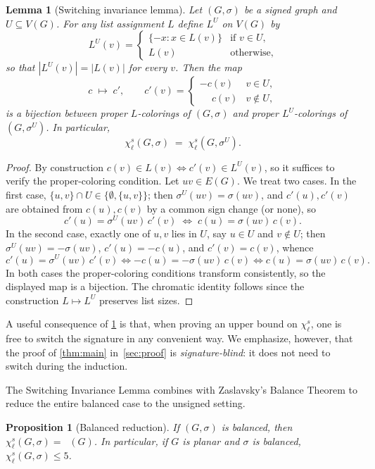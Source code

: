 \documentclass[11pt,a4paper]{article}
\theoremstyle{plain}
\newtheorem{lemma}[theorem]{Lemma}
\newtheorem{proposition}[theorem]{Proposition}
\theoremstyle{definition}
\newcommand{\E}{E}
\newcommand{\V}{V}
\DeclareMathOperator{\chil}{\chi_\ell}
\newcommand{\chs}{\chi_{\ell}^{s}}
\newcommand{\Gs}{(G,\sigma)}
\begin{document}
\begin{lemma}[Switching invariance lemma]\label{lem:switch}
Let $\Gs$ be a signed graph and $U\subseteq\V(G)$. For any list
assignment $L$ define $L^U$ on $\V(G)$ by
\[
L^U(v) =
\begin{cases}
\{-x : x\in L(v)\} & \text{if } v\in U,\\
L(v) & \text{otherwise,}
\end{cases}
\]
so that $|L^U(v)|=|L(v)|$ for every $v$. Then the map
\[
   c\;\longmapsto\;c',\qquad
   c'(v)=\begin{cases}-c(v)&v\in U,\\\phantom{-}c(v)&v\notin U,\end{cases}
\]
is a bijection between proper $L$-colorings of $\Gs$ and proper
$L^U$-colorings of $(G,\sigma^U)$. In particular,
\[
   \chs\Gs \;=\; \chs(G,\sigma^U).
\]
\end{lemma}

\begin{proof}
By construction $c(v)\in L(v) \Leftrightarrow c'(v)\in L^U(v)$, so
it suffices to verify the proper-coloring condition. Let
$uv\in\E(G)$. We treat two cases. In the first case,
$\{u,v\}\cap U\in\{\emptyset,\{u,v\}\}$; then
$\sigma^U(uv)=\sigma(uv)$, and $c'(u),c'(v)$ are obtained from
$c(u),c(v)$ by a common sign change (or none), so
\[
   c'(u)=\sigma^U(uv)\,c'(v)\;\Longleftrightarrow\;
   c(u)=\sigma(uv)\,c(v).
\]
In the second case, exactly one of $u,v$ lies in $U$, say $u\in U$
and $v\notin U$; then $\sigma^U(uv)=-\sigma(uv)$, $c'(u)=-c(u)$,
and $c'(v)=c(v)$, whence
\[
   c'(u)=\sigma^U(uv)\,c'(v)
   \Leftrightarrow -c(u)=-\sigma(uv)\,c(v)
   \Leftrightarrow c(u)=\sigma(uv)\,c(v).
\]
In both cases the proper-coloring conditions transform consistently,
so the displayed map is a bijection. The chromatic identity follows
since the construction $L\mapsto L^U$ preserves list sizes.
\end{proof}

A useful consequence of \cref{lem:switch} is that, when proving an
upper bound on $\chs$, one is free to switch the signature in any
convenient way. We emphasize, however, that the proof of
\cref{thm:main} in~\cref{sec:proof} is \emph{signature-blind}: it
does not need to switch during the induction.

The Switching Invariance Lemma combines with Zaslavsky's Balance
Theorem to reduce the entire balanced case to the unsigned setting.

\begin{proposition}[Balanced reduction]\label{prop:balanced}
If $\Gs$ is balanced, then $\chs\Gs=\chil(G)$. In particular, if
$G$ is planar and $\sigma$ is balanced, $\chs\Gs\le 5$.
\end{proposition}
\end{document}
